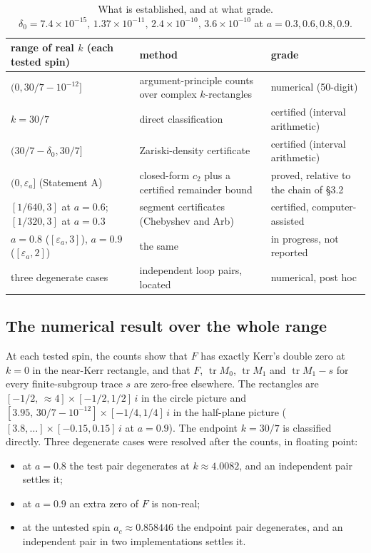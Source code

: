 \documentclass[11pt,a4paper]{article}
\newcommand{\tr}{\operatorname{tr}}
\begin{document}
\begin{table}[h]
\centering\small
\begin{tabular}{@{}p{5.2cm}p{4.9cm}p{4.6cm}@{}}
\toprule
range of real $k$ (each tested spin) & method & grade\\
\midrule
$(0,30/7-10^{-12}]$ & argument-principle counts over complex $k$-rectangles & numerical (50-digit)\\
$k=30/7$ & direct classification & certified (interval arithmetic)\\
$(30/7-\delta_0,30/7]$ & Zariski-density certificate & certified (interval arithmetic)\\
$(0,\varepsilon_a]$ (Statement A) & closed-form $c_2$ plus a certified remainder bound & proved, relative to the chain of \S3.2\\
$[1/640,3]$ at $a=0.6$; $[1/320,3]$ at $a=0.3$ & segment certificates (Chebyshev and Arb) & certified, computer-assisted\\
$a=0.8$ ($[\varepsilon_a,3]$), $a=0.9$ ($[\varepsilon_a,2]$) & the same & in progress, not reported\\
three degenerate cases & independent loop pairs, located & numerical, post hoc\\
\bottomrule
\end{tabular}
\caption{What is established, and at what grade. $\delta_0=7.4\times10^{-15},\,1.37\times10^{-11},\,
2.4\times10^{-10},\,3.6\times10^{-10}$ at $a=0.3,0.6,0.8,0.9$.}
\label{tab:grades}
\end{table}

\subsection{The numerical result over the whole range}
At each tested spin, the counts show that $F$ has exactly Kerr's double zero at $k=0$ in the near-Kerr rectangle,
and that $F$, $\tr M_0$, $\tr M_1$ and $\tr M_1-s$ for every finite-subgroup trace $s$ are zero-free elsewhere. The
rectangles are $[-1/2,\,\approx4]\times[-1/2,1/2]\,i$ in the circle picture and $[3.95,\,30/7-10^{-12}]\times
[-1/4,1/4]\,i$ in the half-plane picture ($[3.8,\dots]\times[-0.15,0.15]\,i$ at $a=0.9$). The endpoint $k=30/7$ is
classified directly. Three degenerate cases were resolved after the counts, in floating point:
\begin{itemize}
\item at $a=0.8$ the test pair degenerates at $k\approx4.0082$, and an independent pair settles it;
\item at $a=0.9$ an extra zero of $F$ is non-real;
\item at the untested spin $a_c\approx0.858446$ the endpoint pair degenerates, and an independent pair in two
implementations settles it.
\end{itemize}
\end{document}
